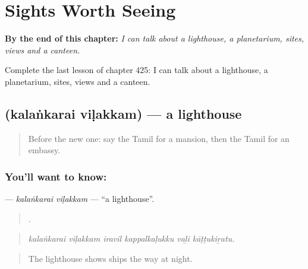 
\chapter{Sights Worth Seeing}
\label{ch:ta-sights-worth-seeing}

\begin{chapteropening}
\textbf{By the end of this chapter:} \emph{I can talk about a lighthouse, a planetarium, sites, views and a canteen.}

Complete the last lesson of chapter 425: I can talk about a lighthouse, a planetarium, sites, views and a canteen.
\end{chapteropening}

\section[\texorpdfstring{\ta{கலங்கரை} \ta{விளக்கம்} (kalaṅkarai viḷakkam)}{கலங்கரை விளக்கம் (kalaṅkarai viḷakkam)}]{  (kalaṅkarai viḷakkam) — a lighthouse}

\label{lesson:TA-C425-kalankarai-vilakkam}



\begin{quote}
Before the new one: say the Tamil for a mansion, then the Tamil for an embassy.
\end{quote}

\subsection*{You'll want to know:  }
\textbf{ } — \emph{kalaṅkarai viḷakkam} — \textquotedblleft{}a lighthouse\textquotedblright{}.

\begin{quote}
     .
\end{quote}

\begin{quote}
\emph{kalaṅkarai viḷakkam iravil kappalkaḷukku vaḻi kāṭṭukiṟatu.}
\end{quote}

\begin{quote}
The lighthouse shows ships the way at night.
\end{quote}

